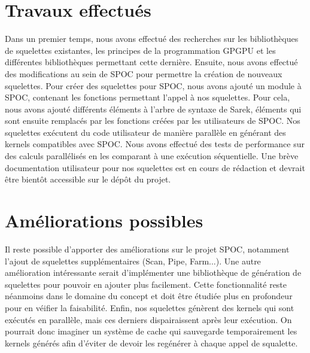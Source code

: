 \documentclass{report}
\begin{document}
\begin{enumerate}
\section{Travaux effectués}
Dans un premier temps, nous avons effectué des recherches sur les bibliothèques de squelettes existantes, les principes de la programmation GPGPU et les différentes bibliothèques permettant cette dernière.\newline
Ensuite, nous avons effectué des modifications au sein de SPOC pour permettre la création de nouveaux squelettes.\newline
Pour créer des squelettes pour SPOC, nous avons ajouté un module à SPOC, contenant les fonctions permettant l'appel à nos squelettes. Pour cela, nous avons ajouté différents éléments à l'arbre de syntaxe de Sarek, éléments qui sont ensuite remplacés par les fonctions créées par les utilisateurs de SPOC.\newline
Nos squelettes exécutent du code utilisateur de manière parallèle en générant des kernels compatibles avec SPOC.\newline
Nous avons effectué des tests de performance sur des calculs parallélisés en les comparant à une exécution séquentielle.\newline
Une brève documentation utilisateur pour nos squelettes est en cours de rédaction et devrait être bientôt accessible sur le dépôt du projet.\newline

\section{Améliorations possibles}
Il reste possible d'apporter des améliorations sur le projet SPOC, notamment l'ajout de squelettes supplémentaires (Scan, Pipe, Farm...).\newline
Une autre amélioration intéressante serait d'implémenter une bibliothèque de génération de squelettes pour pouvoir en ajouter plus facilement. Cette fonctionnalité reste néanmoins dans le domaine du concept et doit être étudiée plus en profondeur pour en véifier la faisabilité.\newline
Enfin, nos squelettes génèrent des kernels qui sont exécutés en parallèle, mais ces derniers dispairaissent après leur exécution. On pourrait donc imaginer un système de cache qui sauvegarde temporairement les kernels générés afin d'éviter de devoir les regénérer à chaque appel de squalette.\newline


\end{enumerate}
\end{document}

